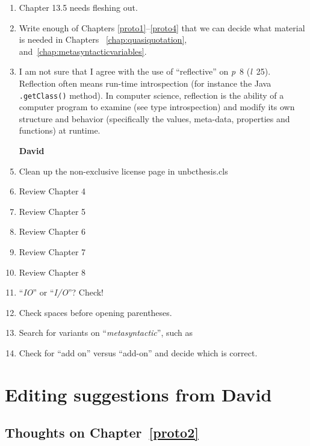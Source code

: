 \begin{scope}
\begin{enumerate}
\item
  Chapter 13.5 needs fleshing out.

\item
  Write enough of Chapters \ref{proto1}--\ref{proto4} that we can decide
  what material is needed in Chapters~ \ref{chap:quasiquotation},
  and~\ref{chap:metasyntacticvariables}.

\item
  I am not sure that I agree with the use of ``reflective'' on
  \textit{p}~8 (\textit{l}~25).  Reflection often means run-time
  introspection (for instance the Java \Verb!.getClass()! method).
  In computer science, reflection is the ability of a computer program to examine (see type introspection) and modify its own structure and behavior (specifically the values, meta-data, properties and functions) at runtime.
  

\item [\textbf{David}]
\item Clean up the non-exclusive license page in unbcthesis.cls
\item Review Chapter 4
\item Review Chapter 5
\item Review Chapter 6
\item Review Chapter 7
\item Review Chapter 8
\item ``\textit{IO}'' or ``\textit{I/O}''?  Check!
\item Check spaces before opening parentheses.
\item Search for variants on ``\textit{metasyntactic}'', such as
\item Check for ``add on'' versus ``add-on'' and decide which is correct.
\end{enumerate}

\section{Editing suggestions from David}\label{sec:edit-sugg-david}

\subsection{Thoughts on Chapter~\ref{proto2}}\label{subsec:thoughts-chapt-proto2}


\end{scope}
